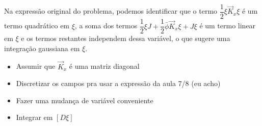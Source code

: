 Na expressão original do problema, podemos identificar que o termo $\dfrac{1}{2}\xi\vec{K}_{x}\xi$ é um termo quadrático em $\xi$, a soma dos termos $\dfrac{1}{2}\xi J + \dfrac{1}{2}\bar{\phi}\vec{K}_{x}\xi + J\xi$ é um termo linear em $\xi$ e os termos restantes independem dessa variável, o que sugere uma integração gaussiana em $\xi$.

\begin{itemize}
    \item Assumir que $\vec{K}_{x}$ é uma matriz diagonal
    \item Discretizar os campos pra usar a expressão da aula 7/8 (eu acho)
    \item Fazer uma mudança de variável conveniente
    \item Integrar em $[D\xi]$
\end{itemize}